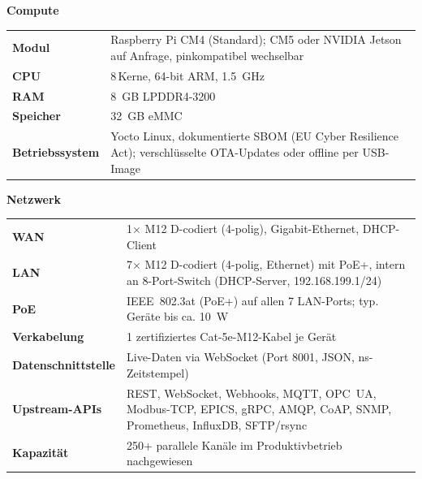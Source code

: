 \documentclass[10pt,a4paper]{article}
\begin{document}
\vspace{2mm}
\begin{minipage}[t]{0.48\textwidth}
\textbf{Compute}\par\vspace{1mm}
\begin{tabularx}{\textwidth}{@{}>{\bfseries}p{2.9cm}X@{}}
\toprule
Modul & Raspberry Pi CM4 (Standard); CM5 oder NVIDIA Jetson auf Anfrage, pinkompatibel wechselbar \\
CPU & 8\,Kerne, 64-bit ARM, \SI{1.5}{GHz} \\
RAM & \SI{8}{GB} LPDDR4-3200 \\
Speicher & \SI{32}{GB} eMMC \\
Betriebssystem & Yocto Linux, dokumentierte SBOM (EU Cyber Resilience Act); verschlüsselte OTA-Updates oder offline per USB-Image \\
\bottomrule
\end{tabularx}

\vspace{2mm}
\textbf{Netzwerk}\par\vspace{1mm}
\begin{tabularx}{\textwidth}{@{}>{\bfseries}p{2.9cm}X@{}}
\toprule
WAN & 1$\times$ M12 D-codiert (4-polig), Gigabit-Ethernet, DHCP-Client \\
LAN & 7$\times$ M12 D-codiert (4-polig, Ethernet) mit PoE+, intern an 8-Port-Switch (DHCP-Server, 192.168.199.1/24) \\
PoE & IEEE~802.3at (PoE+) auf allen 7 LAN-Ports; typ. Geräte bis ca. \SI{10}{W} \\
Verkabelung & 1 zertifiziertes Cat-5e-M12-Kabel je Gerät \\
Datenschnittstelle & Live-Daten via WebSocket (Port 8001, JSON, ns-Zeitstempel) \\
Upstream-APIs & REST, WebSocket, Webhooks, MQTT, OPC~UA, Modbus-TCP, EPICS, gRPC, AMQP, CoAP, SNMP, Prometheus, InfluxDB, SFTP/rsync \\
Kapazität & 250+ parallele Kanäle im Produktivbetrieb nachgewiesen \\
\bottomrule
\end{tabularx}
\end{minipage}\hfill
\end{document}

